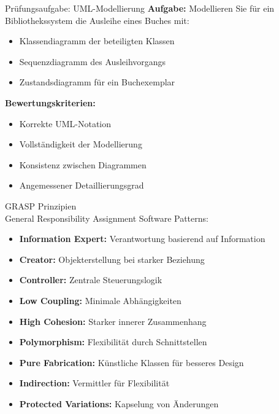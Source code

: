 \begin{example2}{Prüfungsaufgabe: UML-Modellierung}
\textbf{Aufgabe:} 
Modellieren Sie für ein Bibliothekssystem die Ausleihe eines Buches mit:
\begin{itemize}
    \item Klassendiagramm der beteiligten Klassen
    \item Sequenzdiagramm des Ausleihvorgangs
    \item Zustandsdiagramm für ein Buchexemplar
\end{itemize}

\textbf{Bewertungskriterien:}
\begin{itemize}
    \item Korrekte UML-Notation
    \item Vollständigkeit der Modellierung
    \item Konsistenz zwischen Diagrammen
    \item Angemessener Detaillierungsgrad
\end{itemize}
\end{example2}

\begin{theorem}{GRASP Prinzipien}\\
General Responsibility Assignment Software Patterns:
\begin{itemize}
    \item \textbf{Information Expert:} Verantwortung basierend auf Information
    \item \textbf{Creator:} Objekterstellung bei starker Beziehung
    \item \textbf{Controller:} Zentrale Steuerungslogik
    \item \textbf{Low Coupling:} Minimale Abhängigkeiten
    \item \textbf{High Cohesion:} Starker innerer Zusammenhang
    \item \textbf{Polymorphism:} Flexibilität durch Schnittstellen
    \item \textbf{Pure Fabrication:} Künstliche Klassen für besseres Design
    \item \textbf{Indirection:} Vermittler für Flexibilität
    \item \textbf{Protected Variations:} Kapselung von Änderungen
\end{itemize}
\end{theorem}

